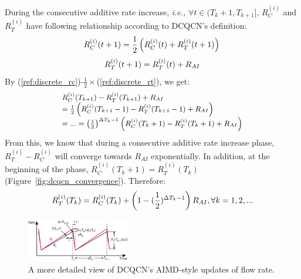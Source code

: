 During the consecutive additive rate increase, {\em i.e.,} 
$\forall t \in ({T_k} + 1,{T_{k + 1}}]$, $R_C^{(i)}$ and $R_T^{(i)}$ 
have following relationship according to DCQCN's definition:
\begin{equation}
\small
R_C^{(i)}(t + 1) = \frac{1}{2}\left( {R_C^{(i)}(t) + R_T^{(i)}(t + 1)} \right)\\
\label{ref:discrete_rc}
\end{equation}
\begin{equation}
\small
R_T^{(i)}(t + 1) = R_T^{(i)}(t) + {R_{AI}}
\label{ref:discrete_rt}
\end{equation}
By (\ref{ref:discrete_rc})-$\frac{1}{2}\times$(\ref{ref:discrete_rt}), we get:
\begin{equation}
\small
\begin{array}{l}
R_C^{(i)}(T_{k + 1}) - R_T^{(i)}(T_{k + 1}) + {R_{AI}}\\
 = \frac{1}{2}\left( {R_C^{(i)}(T_{k + 1} - 1) - R_T^{(i)}(T_{k + 1} - 1) + {R_{AI}}} \right)\\
 = ... = {\left( {\frac{1}{2}} \right)^{\Delta {T_k}-1}}\left( {R_C^{(i)}({T_k} + 1) - R_T^{(i)}({T_k} + 1) + {R_{AI}}} \right)
\end{array}
\end{equation}
From this, we know that during a consecutive additive rate increase phase, $R_T^{(i)} - R_C^{(i)}$
will converge towards $R_{AI}$ exponentially. In addition, at the beginning of the phase, 
$R_C^{(i)}({T_k} + 1) = R_T^{(i)}({T_k})$ (Figure~\ref{fig:dcqcn_convergence}). Therefore:
\begin{equation}
\small
R_T^{(i)}({T_k}) = R_C^{(i)}({T_k}) + \left( 1 - ({\frac{1}{2}})^{\Delta {T_k}-1}\right){R_{AI}},\forall k = 1,2,...
\label{eq:convergence_rt}
\end{equation}

\begin{figure}[t]
\center
\includegraphics[width=0.4\textwidth]{figures/dcqcn_convergence.eps}
\caption{A more detailed view of DCQCN's AIMD-style updates of flow rate.}
\label{fig:dcqcn_convergence_detailed}
\end{figure}

